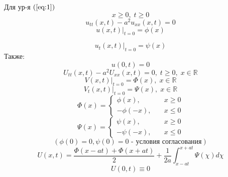\documentclass[a4paper]{article}
\begin{document}
Для ур-я $ (\ref{eq:1}) $ 
\[
    x \geq 0, \; t \geq 0
\]
\[
    u_{tt}(x,t) - a^2 u_{xx}(x,t) = 0
\]
\[
    u(x,t) |_{t=0} = \phi(x)
\]

\[
    u_{t}(x,t) |_{t=0} = \psi(x)
\]
Также:
\[
    u(0,t) = 0
\]
\[
    U_{tt}(x,t) - a^2U_{xx}(x,t) = 0, \; t \geq 0,\; x \in \mathbb{R}
\]
\[
    V(x,t)|_{t=0} = \Phi(x), \; x \in \mathbb{R}
\]
\[
    V_{t}(x,t)|_{t=0} = \Psi(x), \; x \in \mathbb{R}
\]
\[
    \Phi(x) = \begin{cases}
        \phi(x), &\quad x \geq 0\\
        -\phi(-x), &\quad x \leq 0
    \end{cases}
\]
\[
    \Psi(x) = \begin{cases}
        \psi(x), &\quad x \geq 0\\
        -\psi(-x), &\quad x \leq 0
    \end{cases}
\]
\[
    (\phi(0) = 0, \psi(0) = 0 \text{ - условия согласования})
\]
\[
    U(x,t) = \frac{\Phi(x-at)+\Phi(x+at)}{2} + \frac{1}{2a} 
    \int_{x-at}^{x+at} \Psi(\chi)d\chi 
\]
\[
    U(0,t) \equiv 0
\]
\end{document}
